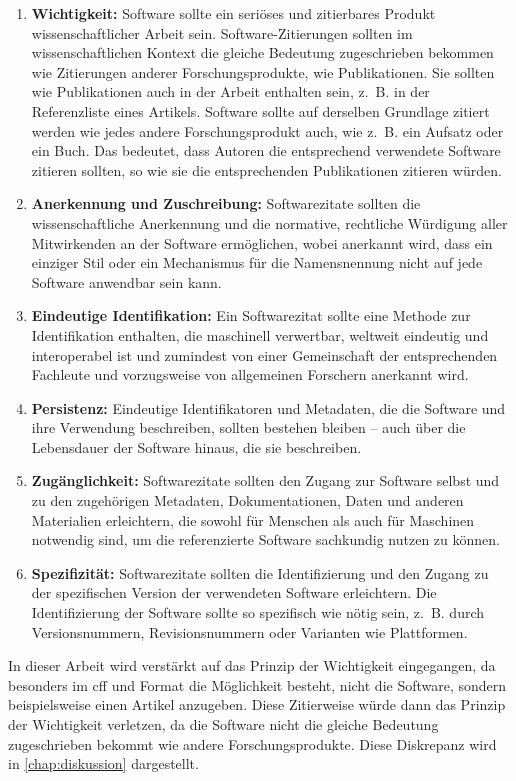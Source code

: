 \begin{enumerate}
    \item \textbf{Wichtigkeit:} Software sollte ein seriöses und zitierbares Produkt wissenschaftlicher Arbeit sein. Software-Zitierungen sollten im wissenschaftlichen Kontext die gleiche Bedeutung zugeschrieben bekommen wie Zitierungen anderer Forschungsprodukte, wie Publikationen. Sie sollten wie Publikationen auch in der Arbeit enthalten sein, z. B. in der Referenzliste eines Artikels. Software sollte auf derselben Grundlage zitiert werden wie jedes andere Forschungsprodukt auch, wie z. B. ein Aufsatz oder ein Buch. Das bedeutet, dass Autoren die entsprechend verwendete Software zitieren sollten, so wie sie die entsprechenden Publikationen zitieren würden.
    \item \textbf{Anerkennung und Zuschreibung:} Softwarezitate sollten die wissenschaftliche Anerkennung und die normative, rechtliche Würdigung aller Mitwirkenden an der Software ermöglichen, wobei anerkannt wird, dass ein einziger Stil oder ein Mechanismus für die Namensnennung nicht auf jede Software anwendbar sein kann.
    \item \textbf{Eindeutige Identifikation:} Ein Softwarezitat sollte eine Methode zur Identifikation enthalten, die maschinell verwertbar, weltweit eindeutig und interoperabel ist und zumindest von einer Gemeinschaft der entsprechenden Fachleute und vorzugsweise von allgemeinen Forschern anerkannt wird.
    \item \textbf{Persistenz:} Eindeutige Identifikatoren und Metadaten, die die Software und ihre Verwendung beschreiben, sollten bestehen bleiben – auch über die Lebensdauer der Software hinaus, die sie beschreiben.
    \item \textbf{Zugänglichkeit:} Softwarezitate sollten den Zugang zur Software selbst und zu den zugehörigen Metadaten, Dokumentationen, Daten und anderen Materialien erleichtern, die sowohl für Menschen als auch für Maschinen notwendig sind, um die referenzierte Software sachkundig nutzen zu können.
    \item \textbf{Spezifizität:} Softwarezitate sollten die Identifizierung und den Zugang zu der spezifischen Version der verwendeten Software erleichtern. Die Identifizierung der Software sollte so spezifisch wie nötig sein, z. B. durch Versionsnummern, Revisionsnummern oder Varianten wie Plattformen.
\end{enumerate}

In dieser Arbeit wird verstärkt auf das Prinzip der Wichtigkeit eingegangen, da besonders im \gls{cff} und  Format die Möglichkeit besteht, nicht die Software, sondern beispielsweise einen Artikel anzugeben.
Diese Zitierweise würde dann das Prinzip der Wichtigkeit verletzen, da die Software nicht die gleiche Bedeutung zugeschrieben bekommt wie andere Forschungsprodukte.
Diese Diskrepanz wird in \autoref{chap:diskussion} dargestellt.

